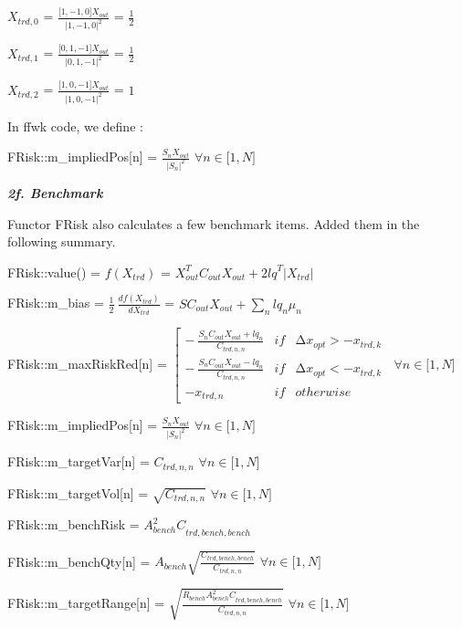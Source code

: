 \(X_{trd,0}\) =
\(\frac{\lbrack 1, - 1,0\rbrack X_{out}}{|1, - 1,0|^{2}}\) =
\(\frac{1}{2}\)

\(X_{trd,1}\) =
\(\frac{\lbrack 0,1, - 1\rbrack X_{out}}{|0,1, - 1|^{2}}\) =
\(\frac{1}{2}\)

\(X_{trd,2}\) =
\(\frac{\lbrack 1,0, - 1\rbrack X_{out}}{|1,0, - 1|^{2}}\) = \(1\)

In ffwk code, we define :

FRisk::m\_impliedPos{[}n{]} =
\(\frac{S_{n}X_{out}}{\left| S_{n} \right|^{2}}\)
\(\forall n \in \lbrack 1,N\rbrack\)

\emph{\textbf{2f. Benchmark}}

Functor FRisk also calculates a few benchmark items. Added them in the
following summary.

FRisk::value() = \(f(X_{trd})\) =
\(X_{out}^{T}C_{out}X_{out} + 2{lq}^{T}\left| X_{trd} \right|\)

FRisk::m\_bias = \(\frac{1}{2}\ \frac{df(X_{trd})}{dX_{trd}}\) =
\(SC_{out}X_{out} + \sum_{n}^{}{{lq}_{n}\mu_{n}}\)

FRisk::m\_maxRiskRed{[}n{]} = \(\left\lbrack \begin{matrix}
 - \ \frac{S_{n}C_{out}X_{out} + {lq}_{n}}{C_{trd,n,n}} & if & {\mathrm{\Delta}x}_{opt} > - x_{trd,k} \\
 - \ \frac{S_{n}C_{out}X_{out} - {lq}_{n}}{C_{trd,n,n}} & if & {\mathrm{\Delta}x}_{opt} < - x_{trd,k} \\
 - x_{trd,n} & if & otherwise
\end{matrix} \right.\ \) \(\forall n \in \lbrack 1,N\rbrack\)

FRisk::m\_impliedPos{[}n{]} =
\(\frac{S_{n}X_{out}}{\left| S_{n} \right|^{2}}\)
\(\forall n \in \lbrack 1,N\rbrack\)

FRisk::m\_targetVar{[}n{]} = \(C_{trd,n,n}\)
\(\forall n \in \lbrack 1,N\rbrack\)

FRisk::m\_targetVol{[}n{]} = \(\sqrt{C_{trd,n,n}}\)
\(\forall n \in \lbrack 1,N\rbrack\)

FRisk::m\_benchRisk = \({A_{bench}^{2}C}_{trd,bench,bench}\)

FRisk::m\_benchQty{[}n{]} =
\(A_{bench}\sqrt{\frac{C_{trd,bench,bench}}{C_{trd,n,n}}}\)
\(\forall n \in \lbrack 1,N\rbrack\)

FRisk::m\_targetRange{[}n{]} =
\(\sqrt{\frac{R_{bench}{A_{bench}^{2}C}_{trd,bench,bench}}{C_{trd,n,n}}}\)
\(\forall n \in \lbrack 1,N\rbrack\)

\textbf{\hfill\break
}

